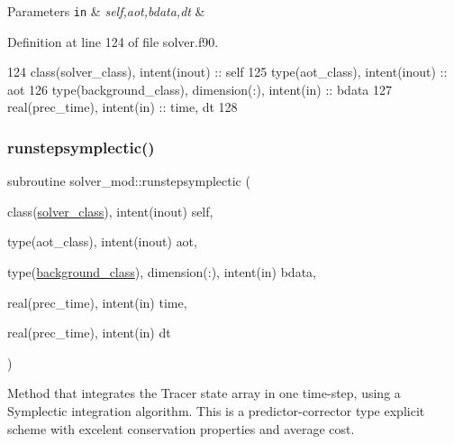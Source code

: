 \begin{DoxyParams}[1]{Parameters}
\mbox{\tt in}  & {\em self,aot,bdata,dt} & \\
\hline
\end{DoxyParams}


Definition at line 124 of file solver.\+f90.


\begin{DoxyCode}
124     \textcolor{keywordtype}{class}(solver\_class), \textcolor{keywordtype}{intent(inout)} :: self
125     \textcolor{keywordtype}{type}(aot\_class), \textcolor{keywordtype}{intent(inout)} :: aot
126     \textcolor{keywordtype}{type}(background\_class), \textcolor{keywordtype}{dimension(:)}, \textcolor{keywordtype}{intent(in)} :: bdata
127     \textcolor{keywordtype}{real(prec\_time)}, \textcolor{keywordtype}{intent(in)} :: time, dt
128 
\end{DoxyCode}
\mbox{\label{namespacesolver__mod_a91ddfd70d0f6d65b00fe6b08f4113cd6}} 
\subsubsection{\texorpdfstring{runstepsymplectic()}{runstepsymplectic()}}
{\footnotesize\ttfamily subroutine solver\+\_\+mod\+::runstepsymplectic (\begin{DoxyParamCaption}\item[{class(\mbox{\hyperlink{structsolver__mod_1_1solver__class}{solver\+\_\+class}}), intent(inout)}]{self,  }\item[{type(aot\+\_\+class), intent(inout)}]{aot,  }\item[{type(\mbox{\hyperlink{structbackground__mod_1_1background__class}{background\+\_\+class}}), dimension(\+:), intent(in)}]{bdata,  }\item[{real(prec\+\_\+time), intent(in)}]{time,  }\item[{real(prec\+\_\+time), intent(in)}]{dt }\end{DoxyParamCaption})\hspace{0.3cm}{\ttfamily [private]}}



Method that integrates the Tracer state array in one time-\/step, using a Symplectic integration algorithm. This is a predictor-\/corrector type explicit scheme with excelent conservation properties and average cost. 

